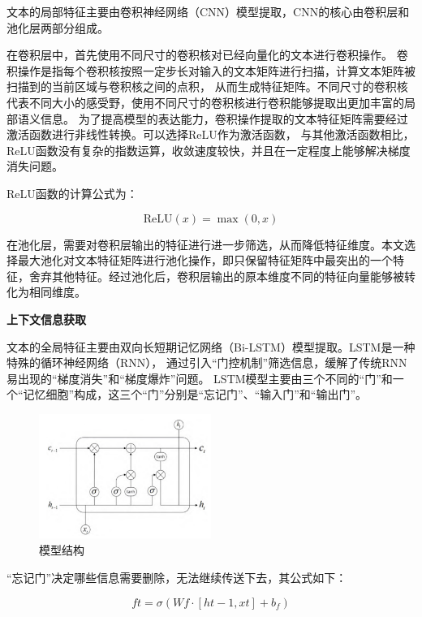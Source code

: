 \documentclass[UTF8,a4paper,15pt,titlepage,oneside]{ctexbook}
\begin{document}
文本的局部特征主要由卷积神经网络（CNN）模型提取，CNN的核心由卷积层和池化层两部分组成。

在卷积层中，首先使用不同尺寸的卷积核对已经向量化的文本进行卷积操作。
卷积操作是指每个卷积核按照一定步长对输入的文本矩阵进行扫描，计算文本矩阵被扫描到的当前区域与卷积核之间的点积，
从而生成特征矩阵。不同尺寸的卷积核代表不同大小的感受野，使用不同尺寸的卷积核进行卷积能够提取出更加丰富的局部语义信息。
为了提高模型的表达能力，卷积操作提取的文本特征矩阵需要经过激活函数进行非线性转换。可以选择ReLU作为激活函数，
与其他激活函数相比，ReLU函数没有复杂的指数运算，收敛速度较快，并且在一定程度上能够解决梯度消失问题。

ReLU函数的计算公式为：

\begin{equation}
  \text{ReLU}(x) = \max(0, x)
\end{equation}
  
在池化层，需要对卷积层输出的特征进行进一步筛选，从而降低特征维度。本文选择最大池化对文本特征矩阵进行池化操作，即只保留特征矩阵中最突出的一个特征，舍弃其他特征。经过池化后，卷积层输出的原本维度不同的特征向量能够被转化为相同维度。

\vskip 0.2cm
\noindent
\textbf{上下文信息获取}

文本的全局特征主要由双向长短期记忆网络（Bi-LSTM）模型提取。LSTM是一种特殊的循环神经网络（RNN），
通过引入“门控机制”筛选信息，缓解了传统RNN易出现的“梯度消失”和“梯度爆炸”问题。
LSTM模型主要由三个不同的“门”和一个“记忆细胞”构成，这三个“门”分别是“忘记门”、“输入门”和“输出门”。

\begin{figure}[H]
  \centering
  \includegraphics[width=0.5\textwidth,keepaspectratio=false]{pictures/47.png} %
  \caption{模型结构}
\end{figure}

“忘记门”决定哪些信息需要删除，无法继续传送下去，其公式如下：

\begin{equation}
  ft = \sigma(Wf \cdot [h{t-1}, xt] + b_f)
\end{equation}
\end{document}
